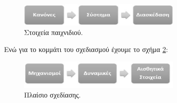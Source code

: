 		\begin{figure}[h]
		    \centering
		    \includegraphics[width=0.7\textwidth]{mda_1.jpg}
		    \caption{Στοιχεία παιχνιδιού.}
		    \label{fig:mda_1}
		\end{figure}	
	
		Ενώ για το κομμάτι του σχεδιασμού έχουμε το σχήμα \ref{fig:mda_2}:	
	
		\begin{figure}[h]
		    \centering
		    \includegraphics[width=0.7\textwidth]{mda_2.jpg}
		    \caption{Πλαίσιο σχεδίασης.}
		    \label{fig:mda_2}
		\end{figure}
	
